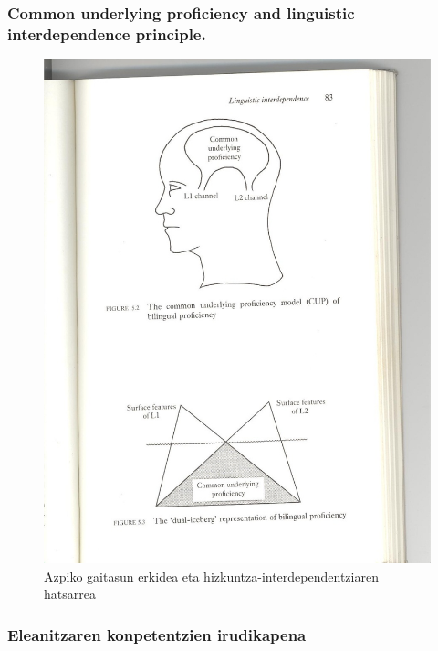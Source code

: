 \documentclass[
]{book}
\begin{document}
\hypertarget{common-underlying-proficiency-and-linguistic-interdependence-principle.}{%
\subsubsection{Common underlying proficiency and linguistic interdependence principle.}\label{common-underlying-proficiency-and-linguistic-interdependence-principle.}}

\begin{figure}
\centering
\includegraphics{Pictures/1000000000000397000004AB80D1D094C3FC57AA.jpg}
\caption{Azpiko gaitasun erkidea eta hizkuntza-interdependentziaren hatsarrea}
\end{figure}

\hypertarget{eleanitzaren-konpetentzien-irudikapena}{%
\subsubsection{Eleanitzaren konpetentzien irudikapena}\label{eleanitzaren-konpetentzien-irudikapena}}
\end{document}
